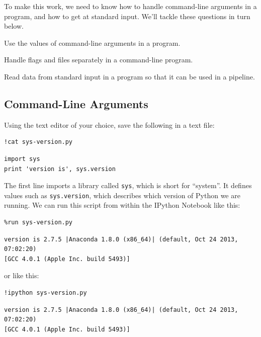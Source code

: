 \documentclass{book}
\begin{document}
To make this work, we need to know how to handle command-line arguments
in a program, and how to get at standard input. We'll tackle these
questions in turn below.

\begin{objectives}
\begin{swcitemize}
\item
  Use the values of command-line arguments in a program.
\item
  Handle flags and files separately in a command-line program.
\item
  Read data from standard input in a program so that it can be used in a
  pipeline.
\end{swcitemize}
\end{objectives}

\subsection{Command-Line Arguments}

Using the text editor of your choice, save the following in a text file:

\begin{verbatim}
!cat sys-version.py
\end{verbatim}

\begin{verbatim}
import sys
print 'version is', sys.version
\end{verbatim}

The first line imports a library called \texttt{sys}, which is short for
``system''. It defines values such as \texttt{sys.version}, which
describes which version of Python we are running. We can run this script
from within the IPython Notebook like this:

\begin{verbatim}
%run sys-version.py
\end{verbatim}

\begin{verbatim}
version is 2.7.5 |Anaconda 1.8.0 (x86_64)| (default, Oct 24 2013, 07:02:20)
[GCC 4.0.1 (Apple Inc. build 5493)]
\end{verbatim}

or like this:

\begin{verbatim}
!ipython sys-version.py
\end{verbatim}

\begin{verbatim}
version is 2.7.5 |Anaconda 1.8.0 (x86_64)| (default, Oct 24 2013, 07:02:20)
[GCC 4.0.1 (Apple Inc. build 5493)]
\end{verbatim}
\end{document}
